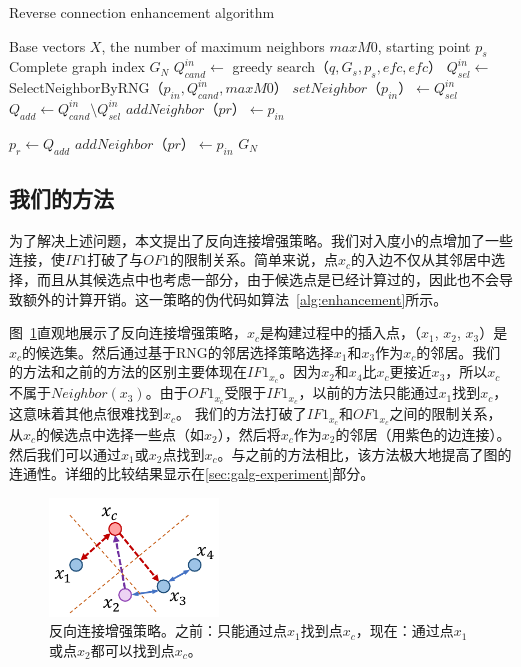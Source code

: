 \begin{algorithm}[tp]
  \caption{Reverse connection enhancement algorithm}
  \label{alg:enhancement} 
  \begin{algorithmic}[1]
      \REQUIRE
      Base vectors $X$, the number of maximum neighbors $maxM0$, starting point $p_s$
      \ENSURE
      Complete graph index $G_N$
      \STATE $Q_{cand}^{in} \gets$ greedy search$（q,G_s,p_s,efc,efc）$
      \STATE $Q_{sel}^{in} \gets$ SelectNeighborByRNG$（p_{in},Q_{cand}^{in},maxM0）$
      \STATE $setNeighbor（p_{in}） \gets Q_{sel}^{in}$
      \STATE $Q_{add} \gets Q_{cand}^{in} \setminus Q_{sel}^{in}$
      \STATE $addNeighbor（pr） \gets p_{in}$
      \ENDFOR
      
      \STATE $p_r \gets Q_{add}$
      \STATE $addNeighbor（pr） \gets p_{in}$
      \ENDWHILE
      \ENDFOR
      \RETURN $G_N$
  \end{algorithmic} 
\end{algorithm}

\subsection{我们的方法}
为了解决上述问题，本文提出了反向连接增强策略。我们对入度小的点增加了一些连接，使$IF1$打破了与$OF1$的限制关系。简单来说，点$x_c$的入边不仅从其邻居中选择，而且从其候选点中也考虑一部分，由于候选点是已经计算过的，因此也不会导致额外的计算开销。这一策略的伪代码如算法~\ref{alg:enhancement}所示。

图~\ref{fig:enhence}直观地展示了反向连接增强策略，$x_c$是构建过程中的插入点，（$x_1$, $x_2$, $x_3$）是$x_c$的候选集。然后通过基于RNG的邻居选择策略选择$x_1$和$x_3$作为$x_c$的邻居。我们的方法和之前的方法的区别主要体现在$IF1_{x_c}$。因为$x_2$和$x_4$比$x_c$更接近$x_3$，所以$x_c$不属于$Neighbor(x_3)$。由于$OF1_{x_c}$受限于$IF1_{x_c}$，以前的方法只能通过$x_1$找到$x_c$，这意味着其他点很难找到$x_c$。
我们的方法打破了$IF1_{x_c}$和$OF1_{x_c}$之间的限制关系，从$x_c$的候选点中选择一些点（如$x_2$），然后将$x_c$作为$x_2$的邻居（用紫色的边连接）。然后我们可以通过$x_1$或$x_2$点找到$x_c$。与之前的方法相比，该方法极大地提高了图的连通性。详细的比较结果显示在\ref{sec:galg-experiment}部分。

\begin{figure}[htbp]
  \centering
  \includegraphics[width=0.4\textwidth]{figures/context-1/enhance.pdf}
  \caption{反向连接增强策略。之前：只能通过点$x_1$找到点$x_c$，现在：通过点$x_1$或点$x_2$都可以找到点$x_c$。}
  \label{fig:enhence}
\end{figure}


